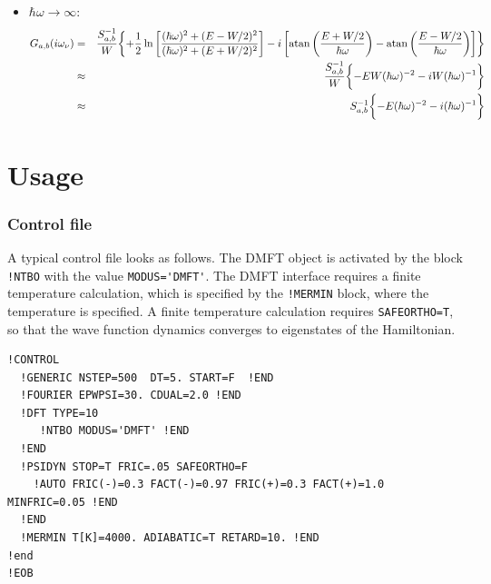 \documentclass[11pt,a4paper]{report}
\begin{document}
\begin{itemize}
%
\item $\hbar\omega\rightarrow \infty$:
\begin{eqnarray}
G_{a,b}(i\omega_\nu)&=&
\frac{S^{-1}_{a,b}}{W}
\biggl\lbrace
+\frac{1}{2}\ln\left[
\frac{(\hbar\omega)^2+(E-W/2)^2}{(\hbar\omega)^2+(E+W/2)^2}
\right]
-i \left[\atan\left(\frac{E+W/2}{\hbar\omega}\right)
-\atan\left(\frac{E-W/2}{\hbar\omega}\right)\right]
\biggr\rbrace
\nonumber\\
%
&\approx&
\frac{S^{-1}_{a,b}}{W}
\biggl\lbrace
-EW(\hbar\omega)^{-2}
-i W (\hbar\omega)^{-1}
\biggr\rbrace
%
\nonumber\\
&\approx&
S^{-1}_{a,b}
\biggl\lbrace
-E(\hbar\omega)^{-2}
-i  (\hbar\omega)^{-1}
\biggr\rbrace
\end{eqnarray}
\end{itemize}

\chapter{Usage}
\subsection{Control file}
A typical control file looks as follows. The DMFT object is activated
by the block \verb|!NTBO| with the value \verb|MODUS='DMFT'|. The DMFT
interface requires a finite temperature calculation, which is
specified by the \verb|!MERMIN| block, where the temperature is
specified.  A finite temperature calculation requires
\verb|SAFEORTHO=T|, so that the wave function dynamics converges to
eigenstates of the Hamiltonian.
\begin{verbatim}
!CONTROL
  !GENERIC NSTEP=500  DT=5. START=F  !END 
  !FOURIER EPWPSI=30. CDUAL=2.0 !END
  !DFT TYPE=10  
     !NTBO MODUS='DMFT' !END   
  !END 
  !PSIDYN STOP=T FRIC=.05 SAFEORTHO=F
    !AUTO FRIC(-)=0.3 FACT(-)=0.97 FRIC(+)=0.3 FACT(+)=1.0 MINFRIC=0.05 !END
  !END
  !MERMIN T[K]=4000. ADIABATIC=T RETARD=10. !END
!end
!EOB
\end{verbatim}

\end{document}
